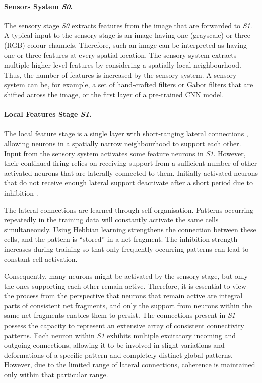 \paragraph{Sensors System \emph{S0}.} The sensory stage \emph{S0} extracts features from the image that are forwarded to \emph{S1}.
A typical input to the sensory stage is an image having one (grayscale) or three (RGB) colour channels. Therefore, such an image can be interpreted as having one or three features at every spatial location.
The sensory system extracts multiple higher-level features by considering a spatially local neighbourhood. Thus, the number of features is increased by the sensory system.
A sensory system can be, for example, a set of hand-crafted filters or Gabor filters that are shifted across the image, or the first layer of a pre-trained CNN model.

\paragraph{Local Features Stage \emph{S1}.} The local feature stage is a single layer with short-ranging lateral connections , allowing neurons in a spatially narrow neighbourhood to support each other. Input from the sensory system activates some feature neurons in \emph{S1}. However, their continued firing relies on receiving support from a sufficient number of other activated neurons that are laterally connected to them. Initially activated neurons that do not receive enough lateral support deactivate after a short period due to inhibition .

The lateral connections are learned through self-organisation. Patterns occurring repeatedly in the training data will constantly activate the same cells simultaneously. Using Hebbian learning strengthens the connection between these cells, and the pattern is ``stored'' in a net fragment. The inhibition strength increases during training so that only frequently occurring patterns can lead to constant cell activation.

Consequently, many neurons might be activated by the sensory stage, but only the ones supporting each other remain active.
Therefore, it is essential to view the process from the perspective that neurons that remain active are integral parts of consistent net fragments, and only the support from neurons within the same net fragments enables them to persist.
The connections present in \emph{S1} possess the capacity to represent an extensive array of consistent connectivity patterns. Each neuron within \emph{S1} exhibits multiple excitatory incoming and outgoing connections, allowing it to be involved in slight variations and deformations of a specific pattern and completely distinct global patterns. However, due to the limited range of lateral connections, coherence is maintained only within that particular range.

